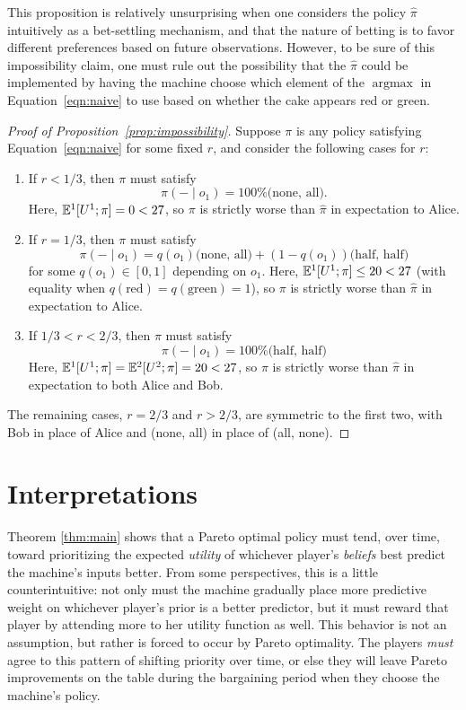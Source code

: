 \documentclass{article}  %
\newcommand{\eqn}[1]{Equation~\ref{eqn:#1}}
\newcommand{\prop}[1]{Proposition~\ref{prop:#1}}
\DeclareMathOperator*{\argmax}{argmax}
\begin{document}
This proposition is relatively unsurprising when one considers the policy $\hat\pi$ intuitively as a bet-settling mechanism, and that the nature of betting is to favor different preferences based on future observations.  However, to be sure of this impossibility claim, one must rule out the possibility that the $\hat\pi$ could be implemented by having the machine choose which element of the $\argmax$ in \eqn{naive} to use based on whether the cake appears red or green.  

\begin{proof}[Proof of \prop{impossibility}] Suppose $\pi$ is any policy satisfying \eqn{naive} for some fixed $r$, and consider the following cases for $r$:
\begin{enumerate}
\item If $r < 1/3 $, then $\pi$ must satisfy
\[
\pi(-\mid o_1) = 100\%\text{(none, all)}.
\] 
Here, $\mathbb{E}^1[U^1 ; \pi] = 0 < 27$, so $\pi$ is strictly worse than $\hat\pi$ in expectation to Alice.

\item If $r = 1/3 $, then $\pi$ must satisfy
\[
\pi(-\mid o_1) = q(o_1)\text{(none, all)} + (1-q(o_1))\text{(half, half)}
\] 
for some $q(o_1)\in[0,1]$ depending on $o_1$.  Here, $\mathbb{E}^1[U^1 ; \pi] \le 20 < 27$ (with equality when $q(\text{red})=q(\text{green})=1$), so $\pi$ is strictly worse than $\hat\pi$ in expectation to Alice.

\item If $1/3 < r < 2/3 $, then $\pi$ must satisfy
\[
\pi(-\mid o_1)=100\%\text{(half, half)}
\]
Here, $\mathbb{E}^1[U^1 ; \pi] = \mathbb{E}^2[U^2 ; \pi] = 20 < 27$, so $\pi$ is strictly worse than $\hat\pi$ in expectation to both Alice and Bob.
\end{enumerate}
The remaining cases, $r=2/3$ and  $r>2/3$, are symmetric to the first two, with Bob in place of Alice and (none, all) in place of (all, none).
\end{proof}

\section{Interpretations}

Theorem \ref{thm:main} shows that a Pareto optimal policy must tend, over time, toward prioritizing the expected {\em utility} of whichever player's \emph{beliefs} best predict the machine's inputs better.  From some perspectives, this is a little counterintuitive: not only must the machine gradually place more predictive weight on whichever player's prior is a better predictor, but it must reward that player by attending more to her utility function as well.  This behavior is not an assumption, but rather is forced to occur by Pareto optimality.  The players \emph{must} agree to this pattern of shifting priority over time, or else they will leave Pareto improvements on the table during the bargaining period when they choose the machine's policy.  
\end{document}

